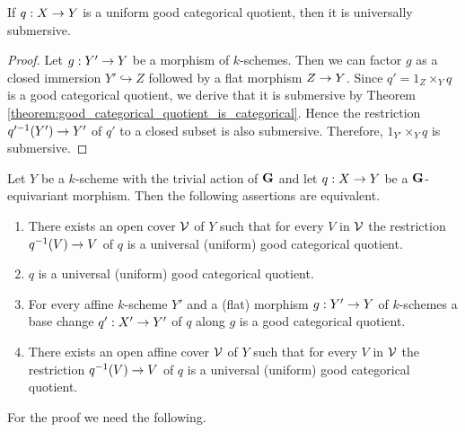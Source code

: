 \begin{corollary}\label{corollary:uniform_good_categorical_quotients_are_universally_submersive}
If $q:X\rightarrow Y$ is a uniform good categorical quotient, then it is universally submersive.
\end{corollary}
\begin{proof}
Let $g:Y'\rightarrow Y$ be a morphism of $k$-schemes. Then we can factor $g$ as a closed immersion $Y'\hookrightarrow Z$ followed by a flat morphism $Z\rightarrow Y$. Since $q' = 1_Z\times_Yq$ is a good categorical quotient, we derive that it is submersive by Theorem \ref{theorem:good_categorical_quotient_is_categorical}. Hence the restriction $q'^{-1}(Y')\rightarrow Y'$ of $q'$ to a closed subset is also submersive. Therefore, $1_{Y'}\times_Yq$ is submersive. 
\end{proof}

\begin{theorem}\label{theorem:uniform_and_universal_good_categorical_quotients_are_local_and_affine_base_change_suffices}
Let $Y$ be a $k$-scheme with the trivial action of $\mathbf{G}$ and let $q:X\rightarrow Y$ be a $\mathbf{G}$-equivariant morphism. Then the following assertions are equivalent.
\begin{enumerate}[label=\emph{\textbf{(\roman*)}}, leftmargin=3.0em]
\item There exists an open cover ${\mathcal V}$ of $Y$ such that for every $V$ in ${\mathcal V}$ the restriction $q^{-1}(V)\rightarrow V$ of $q$ is a universal (uniform) good categorical quotient.
\item $q$ is a universal (uniform) good categorical quotient.
\item For every affine $k$-scheme $Y'$ and a (flat) morphism $g:Y'\rightarrow Y$ of $k$-schemes a base change $q':X'\rightarrow Y'$ of $q$ along $g$ is a good categorical quotient.
\item There exists an open affine cover ${\mathcal V}$ of $Y$ such that for every $V$ in ${\mathcal V}$ the restriction $q^{-1}(V)\rightarrow V$ of $q$ is a universal (uniform) good categorical quotient.
\end{enumerate}
\end{theorem}
\noindent
For the proof we need the following.
    
